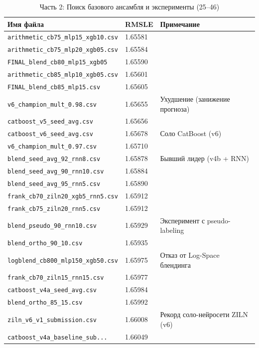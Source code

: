\documentclass[12pt, a4paper]{article}
\begin{document}
	\begin{table}[H]
		\centering\small
		\caption{Часть 2: Поиск базового ансамбля и эксперименты (25–46)}
		\vspace{0.2cm}
		\begin{tabular}{l l p{7cm}}
			\toprule
			\textbf{Имя файла} & \textbf{RMSLE} & \textbf{Примечание} \\
			\midrule
			\texttt{arithmetic\_cb75\_mlp15\_xgb10.csv} & 1.65581 & \\
			\texttt{arithmetic\_cb75\_mlp20\_xgb05.csv} & 1.65584 & \\
			\texttt{FINAL\_blend\_cb80\_mlp15\_xgb05} & 1.65590 & \\
			\texttt{arithmetic\_cb85\_mlp10\_xgb05.csv} & 1.65601 & \\
			\texttt{FINAL\_blend\_cb85\_mlp15.csv} & 1.65605 & \\
			\texttt{v6\_champion\_mult\_0.98.csv} & 1.65655 & Ухудшение (занижение прогноза) \\
			\texttt{catboost\_v5\_seed\_avg.csv} & 1.65656 & \\
			\texttt{catboost\_v6\_seed\_avg.csv} & 1.65678 & Соло CatBoost (v6) \\
			\texttt{v6\_champion\_mult\_0.97.csv} & 1.65710 & \\
			\texttt{blend\_seed\_avg\_92\_rnn8.csv} & 1.65878 & Бывший лидер (v4b + RNN) \\
			\texttt{blend\_seed\_avg\_90\_rnn10.csv} & 1.65884 & \\
			\texttt{blend\_seed\_avg\_95\_rnn5.csv} & 1.65890 & \\
			\texttt{frank\_cb70\_ziln20\_xgb5\_rnn5.csv} & 1.65912 & \\
			\texttt{frank\_cb75\_ziln20\_rnn5.csv} & 1.65912 & \\
			\texttt{blend\_pseudo\_90\_rnn10.csv} & 1.65929 & Эксперимент с pseudo-labeling \\
			\texttt{blend\_ortho\_90\_10.csv} & 1.65935 & \\
			\texttt{logblend\_cb800\_mlp150\_xgb50.csv} & 1.65975 & Отказ от Log-Space блендинга \\
			\texttt{frank\_cb70\_ziln15\_rnn15.csv} & 1.65977 & \\
			\texttt{catboost\_v4a\_seed\_avg.csv} & 1.65984 & \\
			\texttt{blend\_ortho\_85\_15.csv} & 1.65992 & \\
			\texttt{ziln\_v6\_v1\_submission.csv} & 1.66008 & Рекорд соло-нейросети ZILN (v6) \\
			\texttt{catboost\_v4a\_baseline\_sub...} & 1.66049 & \\
			\bottomrule
		\end{tabular}
	\end{table}
	
\end{document}
